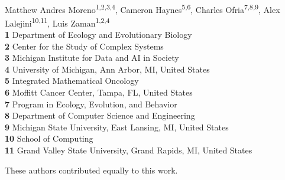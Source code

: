 \begin{flushleft}
{\Large
\textbf{} %
}
\begin{flushleft}
{\large
\textit{} %
}
\newline
\\
Matthew Andres Moreno\textsuperscript{1,2,3,4\Yinyang*},
Cameron Haynes\textsuperscript{5,6\Yinyang},
Charles Ofria\textsuperscript{7,8,9},
Alex Lalejini\textsuperscript{10,11\ddag},
Luis Zaman\textsuperscript{1,2,4\ddag}
\\
\bigskip
\textbf{1} Department of Ecology and Evolutionary Biology\\
\textbf{2} Center for the Study of Complex Systems\\
\textbf{3} Michigan Institute for Data and AI in Society\\
\textbf{4} University of Michigan, Ann Arbor, MI, United States\\
\textbf{5} Integrated Mathematical Oncology\\
\textbf{6} Moffitt Cancer Center, Tampa, FL, United States\\
\textbf{7} Program in Ecology, Evolution, and Behavior\\
\textbf{8} Department of Computer Science and Engineering\\
\textbf{9} Michigan State University, East Lansing, MI, United States\\
\textbf{10} School of Computing\\
\textbf{11} Grand Valley State University, Grand Rapids, MI, United States\\
\bigskip

%
%
\Yinyang These authors contributed equally to this work.


\end{flushleft}
\end{flushleft}
